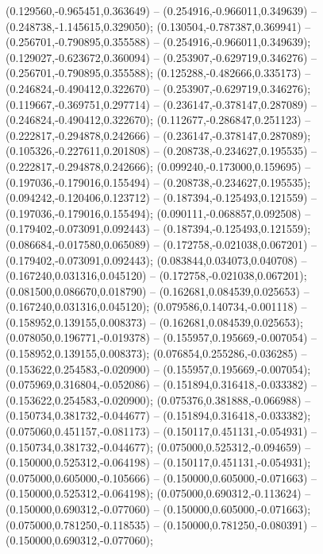  (0.129560,-0.965451,0.363649) -- (0.254916,-0.966011,0.349639) -- (0.248738,-1.145615,0.329050);
 (0.130504,-0.787387,0.369941) -- (0.256701,-0.790895,0.355588) -- (0.254916,-0.966011,0.349639);
 (0.129027,-0.623672,0.360094) -- (0.253907,-0.629719,0.346276) -- (0.256701,-0.790895,0.355588);
 (0.125288,-0.482666,0.335173) -- (0.246824,-0.490412,0.322670) -- (0.253907,-0.629719,0.346276);
 (0.119667,-0.369751,0.297714) -- (0.236147,-0.378147,0.287089) -- (0.246824,-0.490412,0.322670);
 (0.112677,-0.286847,0.251123) -- (0.222817,-0.294878,0.242666) -- (0.236147,-0.378147,0.287089);
 (0.105326,-0.227611,0.201808) -- (0.208738,-0.234627,0.195535) -- (0.222817,-0.294878,0.242666);
 (0.099240,-0.173000,0.159695) -- (0.197036,-0.179016,0.155494) -- (0.208738,-0.234627,0.195535);
 (0.094242,-0.120406,0.123712) -- (0.187394,-0.125493,0.121559) -- (0.197036,-0.179016,0.155494);
 (0.090111,-0.068857,0.092508) -- (0.179402,-0.073091,0.092443) -- (0.187394,-0.125493,0.121559);
 (0.086684,-0.017580,0.065089) -- (0.172758,-0.021038,0.067201) -- (0.179402,-0.073091,0.092443);
 (0.083844,0.034073,0.040708) -- (0.167240,0.031316,0.045120) -- (0.172758,-0.021038,0.067201);
 (0.081500,0.086670,0.018790) -- (0.162681,0.084539,0.025653) -- (0.167240,0.031316,0.045120);
 (0.079586,0.140734,-0.001118) -- (0.158952,0.139155,0.008373) -- (0.162681,0.084539,0.025653);
 (0.078050,0.196771,-0.019378) -- (0.155957,0.195669,-0.007054) -- (0.158952,0.139155,0.008373);
 (0.076854,0.255286,-0.036285) -- (0.153622,0.254583,-0.020900) -- (0.155957,0.195669,-0.007054);
 (0.075969,0.316804,-0.052086) -- (0.151894,0.316418,-0.033382) -- (0.153622,0.254583,-0.020900);
 (0.075376,0.381888,-0.066988) -- (0.150734,0.381732,-0.044677) -- (0.151894,0.316418,-0.033382);
 (0.075060,0.451157,-0.081173) -- (0.150117,0.451131,-0.054931) -- (0.150734,0.381732,-0.044677);
 (0.075000,0.525312,-0.094659) -- (0.150000,0.525312,-0.064198) -- (0.150117,0.451131,-0.054931);
 (0.075000,0.605000,-0.105666) -- (0.150000,0.605000,-0.071663) -- (0.150000,0.525312,-0.064198);
 (0.075000,0.690312,-0.113624) -- (0.150000,0.690312,-0.077060) -- (0.150000,0.605000,-0.071663);
 (0.075000,0.781250,-0.118535) -- (0.150000,0.781250,-0.080391) -- (0.150000,0.690312,-0.077060);
